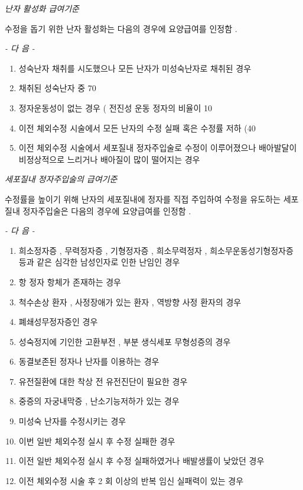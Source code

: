 \par  
\emph{난자 활성화 급여기준}\par 
수정을 돕기 위한 난자 활성화는 다음의 경우에 요양급여를 인정함 . \par

\emph{-  다 음  -}\par  
\begin{enumerate}[가.]\tightlist
\item 성숙난자 채취를 시도했으나 모든 난자가 미성숙난자로 채취된 경우 
\item 채취된 성숙난자 중  70%
\item 정자운동성이 없는 경우 ( 전진성 운동 정자의 비율이  10%
\item 이전 체외수정 시술에서 모든 난자의 수정 실패 혹은 수정률  저하 (40%
\item 이전 체외수정 시술에서 세포질내 정자주입술로 수정이  이루어졌으나 배아발달이 비정상적으로 느리거나 배아질이  많이 떨어지는 경우 
\end{enumerate} 

\par 
\emph{세포질내  정자주입술의  급여기준} \par 
수정률을 높이기 위해 난자의 세포질내에 정자를 직접 주입하여 수정을 유도하는 세포질내 정자주입술은 다음의 경우에 요양급여를 인정함 . \par

\emph{-  다 음  -}\par 
\begin{enumerate}[가.]\tightlist
\item 희소정자증 ,  무력정자증 ,  기형정자증 ,  희소무력정자 ,  희소무운동성기형정자증 등과 같은 심각한 남성인자로 인한 난임인 경우 
\item 항 정자 항체가 존재하는 경우 
\item 척수손상 환자 ,  사정장애가 있는 환자 ,  역방향 사정 환자의 경우 
\item 폐쇄성무정자증인 경우  
\item 성숙정지에 기인한 고환부전 ,  부분 생식세포 무형성증의 경우 
\item 동결보존된 정자나 난자를 이용하는 경우  
\item 유전질환에 대한 착상 전 유전진단이 필요한 경우 
\item 중증의 자궁내막증 ,  난소기능저하가 있는 경우 
\item 미성숙 난자를 수정시키는 경우 
\item 이번 일반 체외수정 실시 후 수정 실패한 경우  
\item 이전 일반 체외수정 실시 후 수정 실패하였거나 배발생률이 낮았던 경우 
\item 이전 체외수정 시술 후  2 회 이상의 반복 임신 실패력이 있는 경우 
\end{enumerate} 

